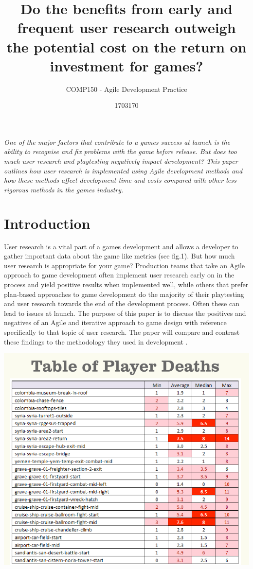 \documentclass{scrartcl}
\title{Do the benefits from early and frequent user research outweigh the potential cost on the return on investment for games?
}
\subtitle{COMP150 - Agile Development Practice}
\author{1703170}
\begin{document}
\maketitle

\textit{One of the major factors that contribute to a games success at launch is the ability to recognise and fix problems with the game before release. But does too much user research and playtesting negatively impact development?  This paper outlines how user research is implemented using Agile development methods and how these methods affect development time and costs compared with other less rigorous methods in the games industry.  }

\section{Introduction}

User research is a vital part of a games development and allows a developer to gather important data about the game like metrics (see fig.1). But how much user research is appropriate for your game? Production teams that take an Agile approach \cite{fowler2001agile:1} to game development often implement user research early on in the process and yield positive results when implemented well, while others that prefer plan-based approaches to game development do the majority of their playtesting and user research towards the end of the development process. Often these can lead to issues at launch. The purpose of this paper is to discuss the positives and negatives of an Agile and iterative approach to game design with reference specifically to that topic of user research. The paper will compare and contrast these findings to the methodology they used in development \cite{politowski2016old:2}.

\begin{center}
\includegraphics[scale=0.4]{PlayerDeathTable.png}
\end{center}
\end{document}
